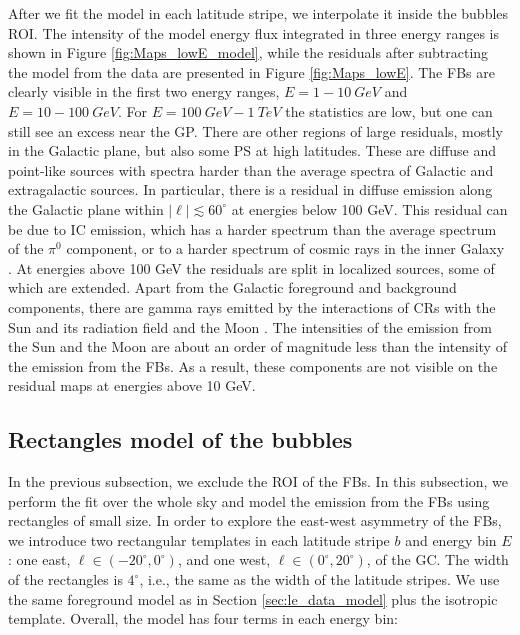 After we fit the model in each latitude stripe, we interpolate it inside the bubbles ROI.
The intensity of the model energy flux integrated in three energy ranges
is shown in Figure \ref{fig:Maps_lowE_model},
while the residuals after subtracting the model from the data are presented in Figure \ref{fig:Maps_lowE}.
The FBs are clearly visible in the first two energy ranges, $E = 1 - \SI{10}{GeV}$ and $E = 10 - \SI{100}{GeV}$.
For $E = \SI{100}{GeV} - \SI{1}{TeV}$ the statistics are low, but one can still see an excess near the GP.
There are other regions of large residuals, mostly in the Galactic plane, but also some PS at high latitudes.
These are diffuse and point-like sources with spectra harder than the average spectra of Galactic and
extragalactic sources.
In particular, there is a residual in diffuse emission along the Galactic plane within $|\ell | \lesssim 60^\circ$ at energies below 100 GeV.
This residual can be due to IC emission, which has a harder spectrum than the average spectrum of the $\pi^0$ component,
or to a harder spectrum of cosmic rays in the inner Galaxy \citep{2015PhRvD..91h3012G, 2016ApJS..223...26A}.
At energies above 100 GeV the residuals are split in localized sources, some of which are extended.
Apart from the Galactic foreground and background components, there are gamma rays emitted by the interactions of CRs with 
the Sun and its radiation field \citep{2011ApJ...734..116A} and the Moon \citep{2016PhRvD..93h2001A}.
The intensities of the emission from the Sun and the Moon are about an order of magnitude less than 
the intensity of the emission from the FBs. 
As a result, these components are not visible on  the residual maps at energies above 10 GeV.


\subsection{Rectangles model of the bubbles}
\label{sec:box_model}

In the previous subsection, we exclude the ROI of the FBs.
In this subsection, we perform the fit over the whole sky and model the emission from the FBs using rectangles of small size.
In order to explore the east-west asymmetry of the FBs, 
we introduce two rectangular templates in each latitude stripe $b$ and energy bin $E$: 
one east, $\ell \in (-20^\circ, 0^\circ)$, and one west, $\ell \in (0^\circ, 20^\circ)$, of the GC.
The width of the rectangles is $4^\circ$, i.e., the same as the width of the latitude stripes.
We use the same foreground model as in Section \ref{sec:le_data_model} plus the isotropic template.
Overall, the model has four terms in each energy bin:

